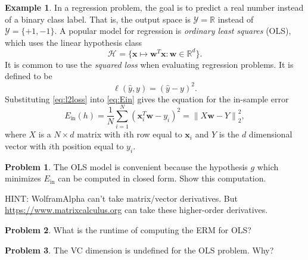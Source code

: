 \documentclass[10pt]{exam}
\theoremstyle{definition}
\newtheorem{problem}{Problem}
\newtheorem{example}{Example}
\newcommand{\R}{\mathbb R}
\DeclareMathOperator*{\argmin}{arg\,min}
\newcommand{\Ein}{E_{\text{in}}}
\newcommand{\trans}[1]{{#1}^{T}}
\newcommand{\w}{\mathbf w}
\newcommand{\x}{\mathbf x}
\newcommand{\ltwo}[1]{{\lVert {#1} \rVert}_2}
\newcommand{\HH}[1]{\mathcal H_{\text{#1}}}
\begin{document}
\begin{example}
    In a regression problem, the goal is to predict a real number instead of a binary class label.
    That is, the output space is $\mathcal Y=\R$ instead of $\mathcal Y = \{+1, -1\}$.
    A popular model for regression is \emph{ordinary least squares} (OLS), which uses the linear hypothesis class
    \begin{equation}
        \HH{} = \bigg\{ \x \mapsto \trans\w \x : \w \in \R^d \bigg\}.
    \end{equation}
    It is common to use the \emph{squared loss} when evaluating regression problems.
    It is defined to be
    \begin{equation}
        \label{eq:l2loss}
        \ell(\hat y, y) = (\hat y - y)^2
        .
    \end{equation}
    Substituting \eqref{eq:l2loss} into \eqref{eq:Ein} gives the equation for the in-sample error
    \begin{equation}
        \Ein(h) 
        = \frac{1}{N}\sum_{i=1}^N (\trans\x_i \w - y_i)^2
        = \ltwo{X\w - Y}^2,
    \end{equation}
    where $X$ is a $N \times d$ matrix with $i$th row equal to $\x_i$ and $Y$ is the $d$ dimensional vector with $i$th position equal to $y_i$.
\end{example}


\begin{problem}
    The OLS model is convenient because the hypothesis $g$ which minimizes $\Ein$ can be computed in closed form.
    Show this computation.

    HINT: WolframAlpha can't take matrix/vector derivatives.
    But \url{https://www.matrixcalculus.org} can take these higher-order derivatives.
\end{problem}

\newpage
\begin{problem}
    What is the runtime of computing the ERM for OLS?
\end{problem}

\vspace{4in}
\begin{problem}
    The VC dimension is undefined for the OLS problem.
    Why?
\end{problem}
\end{document}
